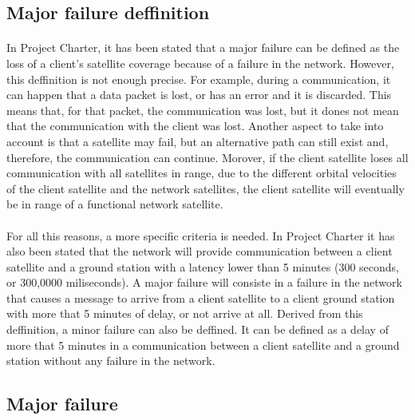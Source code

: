 \subsection{Major failure deffinition}

\paragraph{}In Project Charter, it has been stated that a major failure can be defined as the loss of a client’s satellite coverage because of a failure in the network. However, this deffinition is not enough precise. For example, during a communication, it can happen that a data packet is lost, or has an error and it is discarded. This means that, for that packet, the communication was lost, but it dones not mean that the communication with the client was lost. Another aspect to take into account is that a satellite may fail, but an alternative path can still exist and, therefore, the communication can continue. Morover, if the client satellite loses all communication with all satellites in range, due to the different orbital velocities of the client satellite and the network satellites, the client satellite will eventually be in range of a functional network satellite.

\paragraph{}For all this reasons, a more specific criteria is needed. In Project Charter it has also been stated that the network will provide communication between a client satellite and a ground station with a latency lower than 5 minutes (300 seconds, or 300,0000 miliseconds). A major failure will consiste in a failure in the network that causes a message to arrive from a client satellite to a client ground station with more that 5 minutes of delay, or not arrive at all. Derived from this deffinition, a minor failure can also be deffined. It can be defined as a delay of more that 5 minutes in a communication between a client satellite and a ground station without any failure in the network.

\subsection{Major failure}

